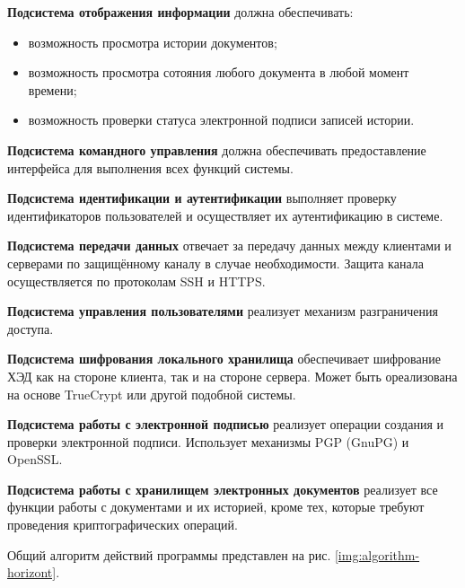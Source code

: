 \vspace{\baselineskip}
\textbf{Подсистема отображения информации} должна обеспечивать:
\begin{itemize}
	\item возможность просмотра истории документов;
	\item возможность просмотра сотояния любого документа в любой момент времени;
	\item возможность проверки статуса электронной подписи записей истории.
\end{itemize}

\vspace{\baselineskip}
\textbf{Подсистема командного управления} должна обеспечивать предоставление интерфейса для выполнения всех функций системы.

\vspace{\baselineskip}
\textbf{Подсистема идентификации и аутентификации} выполняет проверку идентификаторов пользователей и осуществляет их аутентификацию в системе.

\vspace{\baselineskip}
\textbf{Подсистема передачи данных} отвечает за передачу данных между клиентами и серверами по защищённому каналу в случае необходимости. Защита канала осуществляется по протоколам SSH и HTTPS.

\vspace{\baselineskip}
\textbf{Подсистема управления пользователями} реализует механизм разграничения доступа.

\vspace{\baselineskip}
\textbf{Подсистема шифрования локального хранилища} обеспечивает шифрование ХЭД как на стороне клиента, так и на стороне сервера. Может быть ореализована на основе TrueCrypt или другой подобной системы.

\vspace{\baselineskip}
\textbf{Подсистема работы с электронной подписью} реализует операции создания и проверки электронной подписи. Использует механизмы PGP (GnuPG) и OpenSSL.

\vspace{\baselineskip}
\textbf{Подсистема работы с хранилищем электронных документов} реализует все функции работы с документами и их историей, кроме тех, которые требуют проведения криптографических операций.

\vspace{\baselineskip}
Общий алгоритм действий программы представлен на рис. \ref{img:algorithm-horizont}.

